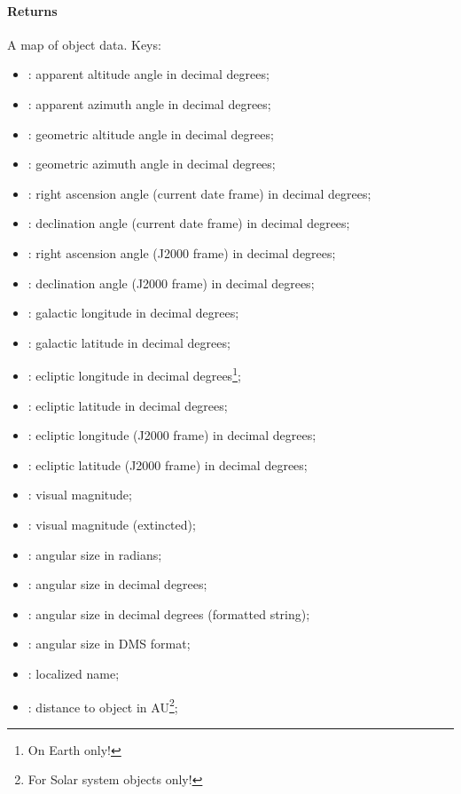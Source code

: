 \paragraph{Returns}
A map of object data. Keys:
\begin{itemize}
\item {}: apparent altitude angle in decimal degrees;
\item {}: apparent azimuth angle in decimal degrees;
\item {}: geometric altitude angle in decimal degrees;
\item {}: geometric azimuth angle in decimal degrees;
\item {}: right ascension angle (current date frame) in decimal degrees;
\item {}: declination angle (current date frame) in decimal degrees;
\item {}: right ascension angle (J2000 frame) in decimal degrees;
\item {}: declination angle (J2000 frame) in decimal degrees;
\item {}: galactic longitude in decimal degrees;
\item {}: galactic latitude in decimal degrees;
\item {}: ecliptic longitude in decimal degrees\footnote[1]{On Earth only!};
\item {}: ecliptic latitude in decimal degrees\footnotemark[1];
\item {}: ecliptic longitude (J2000 frame) in decimal degrees\footnotemark[1];
\item {}: ecliptic latitude (J2000 frame) in decimal degrees\footnotemark[1];
\item {}: visual magnitude;
\item {}: visual magnitude (extincted);
\item {}: angular size in radians;
\item {}: angular size in decimal degrees;
\item {}: angular size in decimal degrees (formatted string);
\item {}: angular size in DMS format;
\item {}: localized name;
\item {}: distance to object in AU\footnote[2]{For Solar system objects only!};

\end{itemize}
